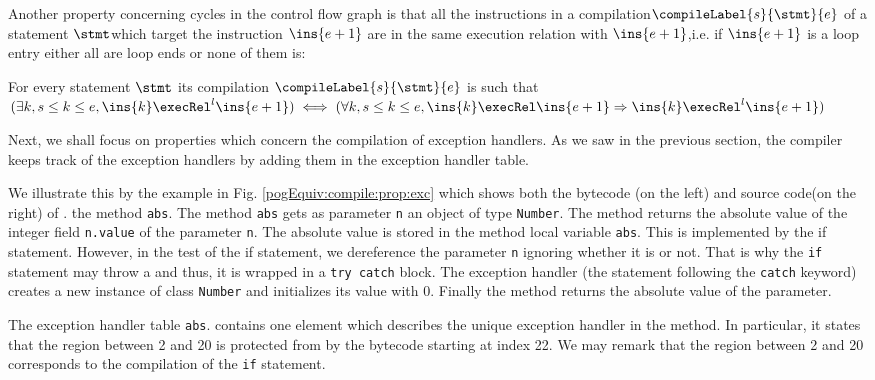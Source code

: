 Another property concerning cycles in the control flow graph is that all the instructions in a compilation$\compileLabel{s}{\stmt}{e}$   of a statement $\stmt 
$which target the instruction $\ins{e+1}$  are in the same execution relation with  $\ins{e+1}$,i.e. if  
$\ins{e+1}$ is a  loop entry either all are loop ends or none of them is:
\begin{compProp5}\label{compile:prop:compProp5} 
 For every statement $\stmt$ its compilation $\compileLabel{s}{\stmt}{e}$ is such that 
$(\exists k, s \le k \le e, \ins{k} \execRel^{l} \ins{e+1} ) \iff (\forall k, s \le k \le e, \ins{k} \execRel \ins{e+1}  \Rightarrow \ins{k} \execRel^{l} \ins{e+1} ) $
\end{compProp5}


Next, we shall focus on properties which concern the compilation of exception handlers. 
As we saw in the previous section, the compiler keeps track of the exception 
handlers by adding them in the exception handler table. 

We illustrate this by the example in Fig. \ref{pogEquiv:compile:prop:exc} which shows both the bytecode (on the left) and source code(on the right)
 of . the method \lstinline!abs!.
The method \lstinline!abs! gets as parameter \lstinline!n! an object of type  \lstinline!Number!.
 The method returns  the absolute value of the integer field \lstinline!n.value! of the parameter \lstinline!n!. The absolute value is stored
in the method local variable \lstinline!abs!. This is implemented by the if statement. However, in the test of the if statement, we dereference
 the parameter  \lstinline!n! ignoring whether it is \Mynull{} or not. That is why the \lstinline!if! statement may throw a \NullPointerExc{} and thus,
 it is wrapped in a \lstinline!try catch! block. 
The exception handler (the statement following the \lstinline!catch! keyword)
 creates a new instance of class \lstinline!Number! and initializes its value with 0. 
Finally the method returns the absolute value of the parameter.

 The exception handler table  \lstinline!abs!.\ExcHandler{}  contains one element which describes the unique exception handler
in the method. In particular, it states that the region between 2 and 20 is protected from \NullPointerExc{} by the bytecode starting at index 22.
 We may remark that the region between 2 and 20 corresponds to the compilation of the \lstinline!if! statement. 

